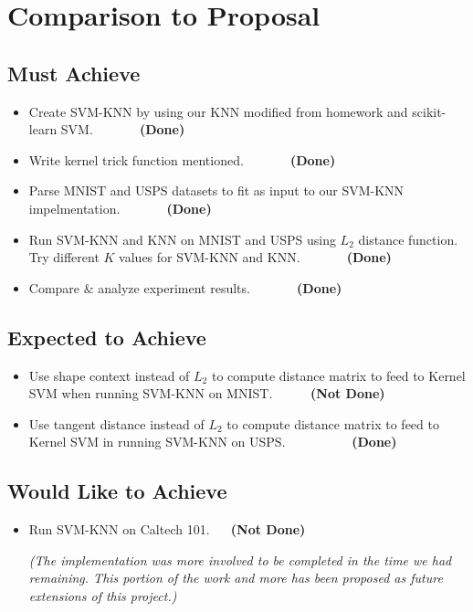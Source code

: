 \documentclass[11pt,letterpaper]{article}
\begin{document}
\section{Comparison to Proposal}

\subsection{Must Achieve}

\begin{itemize}
\item Create SVM-KNN by using our KNN modified from homework and scikit-learn SVM. $\>\>\>\>\>\>\>\>\>\>\>\>\>\>\>$\textbf{(Done)}
\item Write kernel trick function mentioned. $\>\>\>\>\>\>\>\>\>\>\>\>\>\>\>$\textbf{(Done)}
\item Parse MNIST and USPS datasets to fit as input to our SVM-KNN impelmentation. $\>\>\>\>\>\>\>\>\>\>\>\>\>\>\>$\textbf{(Done)}
\item Run SVM-KNN and KNN on MNIST and USPS using $L_2$ distance function. Try different $K$ values for SVM-KNN and KNN. $\>\>\>\>\>\>\>\>\>\>\>\>\>\>\>$\textbf{(Done)}
\item Compare $\&$ analyze experiment results. $\>\>\>\>\>\>\>\>\>\>\>\>\>\>\>$\textbf{(Done)}
\end{itemize}

\subsection{Expected to Achieve}
\begin{itemize}
\item Use shape context instead of $L_2$ to compute distance matrix to feed to Kernel SVM when running SVM-KNN on MNIST. $\>\>\>\>\>\>\>\>\>\>\>\>$\textbf{(Not Done)}

\item Use tangent distance instead of $L_2$ to compute distance matrix to feed to Kernel SVM in running SVM-KNN on USPS. $\>\>\>\>\>\>\>\>\>\>\>\>\>\>\>\>\>\>\>\>\>\>$\textbf{(Done)}
\end{itemize}

\subsection{Would Like to Achieve}
\begin{itemize}
\item Run SVM-KNN on Caltech 101. $\>\>\>\>\>\>$\textbf{(Not Done)}

\textit{(The implementation was more involved to be completed in the time we had remaining. This portion of the work and more has been proposed as future extensions of this project.)}
\end{itemize}
\end{document}
